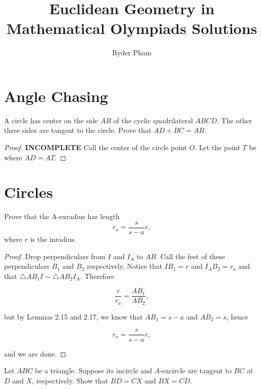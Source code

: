 \documentclass[letterpaper,oneside]{scrartcl}
\providecommand{\ol}{\overline}
\begin{document}
\title{Euclidean Geometry in Mathematical Olympiads Solutions}
\author{Ryder Pham}
\maketitle

\section{Angle Chasing}
\begin{problem*}
  [1.51, IMO 1985/1]
  A circle has center on the side $\ol{AB}$ of the cyclic quadrilateral $ABCD$. The other three sides are tangent to the circle. Prove that $AD + BC = AB$.
\end{problem*}

\begin{proof}
  \textbf{INCOMPLETE} Call the center of the circle point $O.$ Let the point $T$ be where $AD = AT.$
\end{proof}
\newpage
\section{Circles}

\begin{lemma*}
  [2.19]
  Prove that the A-exradius has length
  $$r_a = \frac{s}{s-a}r,$$
  where $r$ is the inradius.
\end{lemma*}

\begin{proof}
    Drop perpendiculars from $I$ and $I_A$ to $AB$. Call the feet of these perpendiculars $B_1$ and $B_2$ respectively. Notice that $IB_1 = r$ and $I_AB_2 = r_a$ and that $\triangle AB_1I \sim \triangle AB_2I_A$. Therefore 

$$\frac{r}{r_a} = \frac{AB_1}{AB_2},$$

but by Lemmas 2.15 and 2.17, we know that $AB_1 = s-a$ and $AB_2 = s$, hence 

$$r_a = \frac{s}{s-a}r,$$

and we are done.
\end{proof}

\begin{lemma*}
  [2.20]
  Let $ABC$ be a triangle. Suppose its incircle and $A$-excircle are tangent to $BC$ at $D$ and $X$, respectively. Show that $BD = CX$ and $BX = CD$. 
\end{lemma*}
\end{document}
